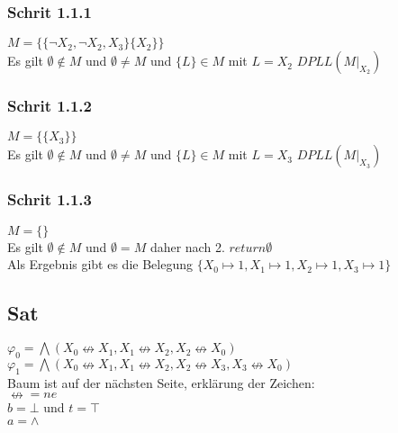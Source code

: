 \subsubsection*{Schrit 1.1.1}
$M= \{ 
\{ \neg X_2 , \neg X_2 , X_3 \}
\{  X_2 \}
 \} $\\
Es gilt $\emptyset \not \in M$ und $  \emptyset \neq M$ und $\{ L \}  \in M$ mit $L= X_2$ $DPLL(M\vert_{X_2})$ 

\subsubsection*{Schrit 1.1.2}
$M= \{ 
\{  X_3 \}
 \} $\\
Es gilt $\emptyset \not \in M$ und $  \emptyset \neq M$ und $\{ L \}  \in M$ mit $L= X_3$ $DPLL(M\vert_{X_3})$ 

\subsubsection*{Schrit 1.1.3}
$M= \{ 
 \} $\\
Es gilt $\emptyset \not \in M$ und $  \emptyset = M$ daher nach 2. $return \emptyset$\\

Als Ergebnis gibt es die Belegung $\{ X_0 \mapsto 1 , X_1 \mapsto 1 , X_2 \mapsto 1 , X_3 \mapsto 1  \}$

\subsection*{Sat}

 $\varphi_0 = \bigwedge (X_0 \nleftrightarrow X_1 , X_1 \nleftrightarrow X_2 , X_2 \nleftrightarrow X_0 )$\\


 $\varphi_1 = \bigwedge (X_0 \nleftrightarrow X_1 , X_1 \nleftrightarrow X_2 , X_2 \nleftrightarrow X_3 , X_3 \nleftrightarrow X_0 )$\\
 
 Baum ist auf der nächsten Seite, erklärung der Zeichen:\\
$\nleftrightarrow = ne$\\
$b = \bot$  und $t = \top$\\
$a = \wedge$
 
 
 

